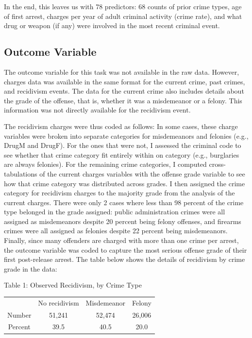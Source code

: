 \documentclass{article}
\begin{document}
In the end, this leaves us with 78 predictors: 68 counts of prior crime types, age of first arrest, charges per year of adult criminal activity (crime rate), and what drug or weapon (if any) were involved in the most recent criminal event. 

\subsection{Outcome Variable}

The outcome variable for this task was not available in the raw data. However, charges data was available in the same format for the current crime, past crimes, and recidivism events. The data for the current crime also includes details about the grade of the offense, that is, whether it was a misdemeanor or a felony. This information was not directly available for the recidivism event. 

The recidivism charges were thus coded as follows: In some cases, these charge variables were broken into separate categories for misdemeanors and felonies (e.g., DrugM and DrugF). For the ones that were not, I assessed the criminal code to see whether that crime category fit entirely within on category (e.g., burglaries are always felonies). For the remaining crime categories, I computed cross-tabulations of the current charges variables with the offense grade variable to see how that crime category was distributed across grades. I then assigned the crime category for recidivism charges to the majority grade from the analysis of the current charges. There were only 2 cases where less than 98 percent of the crime type belonged in the grade assigned: public administration crimes were all assigned as misdemeanors despite 20 percent being felony offenses, and firearms crimes were all assigned as felonies despite 22 percent being misdemeanors. Finally, since many offenders are charged with more than one crime per arrest, the outcome variable was coded to capture the most serious offense grade of their first post-release arrest. The table below shows the details of recidivism by crime grade in the data:

\begin{center}
Table 1: Observed Recidivism, by Crime Type
\begin{tabular}{ c c c c }
  & No recidivism & Misdemeanor & Felony \\ 
 Number & 51,241 & 52,474 & 26,006 \\ 
 Percent & 39.5 & 40.5 & 20.0 \\  
\end{tabular}
\end{center}
\end{document}
